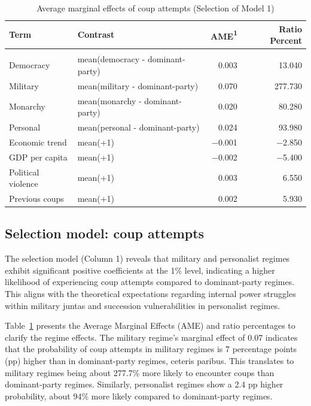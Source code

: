 \documentclass[
  12pt,
]{report}
\begin{document}
\begin{longtable}[]{@{}llrr@{}}

\caption{\label{tbl-mfx1}Average marginal effects of coup attempts
(Selection of Model 1)}

\tabularnewline

\toprule\noalign{}
Term & Contrast & AME{\textsuperscript{1}} & Ratio Percent \\
\midrule\noalign{}
\endhead
\midrule\noalign{}
\multicolumn{4}{@{}l@{}}{%
{\textsuperscript{1}} AME: Average Marginal Effect} \\
\bottomrule\noalign{}
\endlastfoot
Democracy & mean(democracy - dominant-party) & 0.003 & 13.040 \\
Military & mean(military - dominant-party) & 0.070 & 277.730 \\
Monarchy & mean(monarchy - dominant-party) & 0.020 & 80.280 \\
Personal & mean(personal - dominant-party) & 0.024 & 93.980 \\
Economic trend & mean(+1) & −0.001 & −2.850 \\
GDP per capita & mean(+1) & −0.002 & −5.400 \\
Political violence & mean(+1) & 0.003 & 6.550 \\
Previous coups & mean(+1) & 0.002 & 5.930 \\

\end{longtable}

\subsection{Selection model: coup
attempts}\label{selection-model-coup-attempts}

The selection model (Column 1) reveals that military and personalist
regimes exhibit significant positive coefficients at the 1\% level,
indicating a higher likelihood of experiencing coup attempts compared to
dominant-party regimes. This aligns with the theoretical expectations
regarding internal power struggles within military juntas and succession
vulnerabilities in personalist regimes.

Table~\ref{tbl-mfx1} presents the Average Marginal Effects (AME) and
ratio percentages to clarify the regime effects. The military regime's
marginal effect of 0.07 indicates that the probability of coup attempts
in military regimes is 7 percentage points (pp) higher than in
dominant-party regimes, ceteris paribus. This translates to military
regimes being about 277.7\% more likely to encounter coups than
dominant-party regimes. Similarly, personalist regimes show a 2.4 pp
higher probability, about 94\% more likely compared to dominant-party
regimes.
\end{document}
